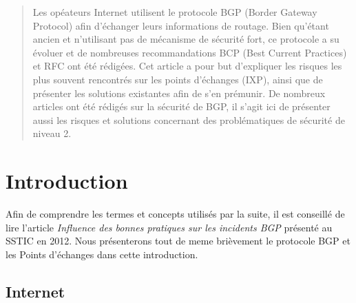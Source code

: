 



\maketitle
{}

\begin{abstract}
 Les opéateurs Internet utilisent le protocole BGP (Border Gateway Protocol) afin d'échanger leurs informations de routage. Bien qu'étant ancien et n'utilisant pas de mécanisme de sécurité fort, ce protocole a su évoluer et de nombreuses recommandations BCP (Best Current Practices) et RFC ont été rédigées.
 Cet article a pour but d'expliquer les risques les plus souvent rencontrés sur les points d'échanges (IXP), ainsi que de présenter les solutions existantes afin de s'en prémunir. 
 De nombreux articles ont été rédigés sur la sécurité de BGP, il s'agit ici de présenter aussi les risques et solutions concernant des problématiques de sécurité de niveau 2.
\end{abstract}


\section{Introduction}

Afin de comprendre les termes et concepts utilisés par la suite, il est conseillé de lire l'article \emph{Influence des bonnes pratiques sur les incidents BGP} \cite{fenioux:SSTIC2012} présenté au SSTIC en 2012. Nous présenterons tout de meme brièvement le protocole BGP et les Points d'échanges dans cette introduction.

\subsection{Internet}

